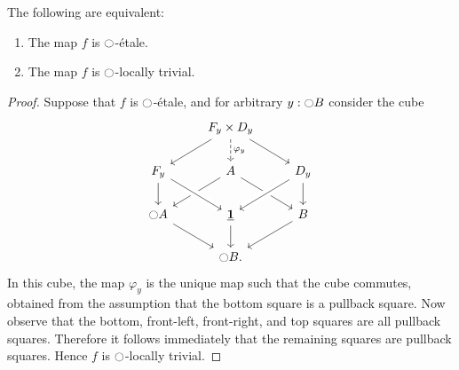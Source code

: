 \documentclass[9pt,twosided]{amsart}
\begin{document}
\begin{prp}\label{prp:locally_trivial}
  The following are equivalent:
  \begin{enumerate}
  \item The map $f$ is ${\ocircle}$-\'etale.
  \item The map $f$ is ${\ocircle}$-locally trivial.
  \end{enumerate}
\end{prp}

\begin{proof}
  Suppose that $f$ is ${\ocircle}$-\'etale, and for arbitrary $y:{\ocircle} B$ consider the cube
    \begin{equation*}
    \begin{tikzcd}
      & F_y\times D_y \arrow[dl] \arrow[d,dashed,"\varphi_y"] \arrow[dr] & \phantom{\modal A}\\
      F_y \arrow[d] & A \arrow[dl] \arrow[dr] & D_y \arrow[d] \arrow[dl,crossing over] \\
      \modal A \arrow[dr] & \unit \arrow[from=ul,crossing over] \arrow[d] & B \arrow[dl] \\
      & \modal B.
    \end{tikzcd}
  \end{equation*}
  In this cube, the map $\varphi_y$ is the unique map such that the cube commutes, obtained from the assumption that the bottom square is a pullback square. Now observe that the bottom, front-left, front-right, and top squares are all pullback squares. Therefore it follows immediately that the remaining squares are pullback squares. Hence $f$ is ${\ocircle}$-locally trivial.


\end{proof}
\end{document}
